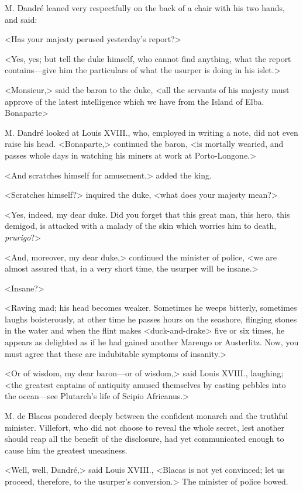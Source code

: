  M. Dandré leaned very respectfully on the back of a chair with his two hands, and said: 

 <Has your majesty perused yesterday's report?> 

 <Yes, yes; but tell the duke himself, who cannot find anything, what the report contains—give him the particulars of what the usurper is doing in his islet.> 

 <Monsieur,> said the baron to the duke, <all the servants of his majesty must approve of the latest intelligence which we have from the Island of Elba. Bonaparte\longdash> 

 M. Dandré looked at Louis XVIII., who, employed in writing a note, did not even raise his head. <Bonaparte,> continued the baron, <is mortally wearied, and passes whole days in watching his miners at work at Porto-Longone.> 

 <And scratches himself for amusement,> added the king. 

 <Scratches himself?> inquired the duke, <what does your majesty mean?> 

 <Yes, indeed, my dear duke. Did you forget that this great man, this hero, this demigod, is attacked with a malady of the skin which worries him to death, \textit{prurigo}?> 

 <And, moreover, my dear duke,> continued the minister of police, <we are almost assured that, in a very short time, the usurper will be insane.> 

 <Insane?> 

 <Raving mad; his head becomes weaker. Sometimes he weeps bitterly, sometimes laughs boisterously, at other time he passes hours on the seashore, flinging stones in the water and when the flint makes <duck-and-drake> five or six times, he appears as delighted as if he had gained another Marengo or Austerlitz. Now, you must agree that these are indubitable symptoms of insanity.> 

 <Or of wisdom, my dear baron—or of wisdom,> said Louis XVIII., laughing; <the greatest captains of antiquity amused themselves by casting pebbles into the ocean—see Plutarch's life of Scipio Africanus.> 

 M. de Blacas pondered deeply between the confident monarch and the truthful minister. Villefort, who did not choose to reveal the whole secret, lest another should reap all the benefit of the disclosure, had yet communicated enough to cause him the greatest uneasiness. 

 <Well, well, Dandré,> said Louis XVIII., <Blacas is not yet convinced; let us proceed, therefore, to the usurper's conversion.> The minister of police bowed. 

